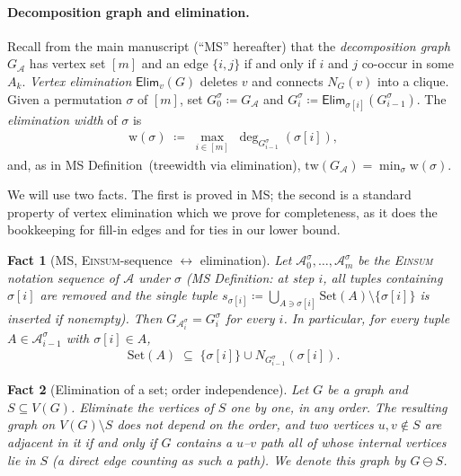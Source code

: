 \documentclass[11pt]{article}
\newcommand{\Einsum}{\textsc{Einsum}}
\newcommand{\calA}{\mathcal{A}}
\newcommand{\tw}{\mathrm{tw}}
\newcommand{\treewidthp}[1]{\tw(#1)}
\newcommand{\takesetp}[1]{\mathrm{Set}(#1)}
\newcommand{\degp}[2]{\deg_{#2}(#1)}
\newcommand{\eliminatevg}[2]{\mathsf{Elim}_{#1}(#2)}
\newcommand{\graphform}[1]{G_{#1}}
\newcommand{\wid}{\mathrm{w}}
\theoremstyle{plain}
\newtheorem{fact}{Fact}
\theoremstyle{definition}
\theoremstyle{remark}
\begin{document}
\paragraph{Decomposition graph and elimination.}
Recall from the main manuscript (``MS'' hereafter) that the
\emph{decomposition graph} $\graphform{\calA}$ has vertex set $[m]$ and an
edge $\{i,j\}$ if and only if $i$ and $j$ co-occur in some $A_k$.
\emph{Vertex elimination} $\eliminatevg{v}{G}$ deletes $v$ and connects
$N_G(v)$ into a clique.  Given a permutation $\sigma$ of $[m]$, set
$G^\sigma_0 \coloneqq \graphform{\calA}$ and
$G^\sigma_i \coloneqq \eliminatevg{\sigma[i]}{G^\sigma_{i-1}}$.  The
\emph{elimination width} of $\sigma$ is
\begin{align*}
   \wid(\sigma) \;\coloneqq\; \max_{i \in [m]}\;
   \degp{\sigma[i]}{G^\sigma_{i-1}},
\end{align*}
and, as in MS Definition~(treewidth via elimination),
$\treewidthp{\graphform{\calA}} = \min_\sigma \wid(\sigma)$.

We will use two facts.  The first is proved in MS; the second is a
standard property of vertex elimination which we prove for completeness,
as it does the bookkeeping for fill-in edges and for ties in our lower
bound.

\begin{fact}[MS, \Einsum{}-sequence $\leftrightarrow$ elimination]
\label{fact:ms}
Let $\calA^\sigma_0,\dots,\calA^\sigma_m$ be the \Einsum{} notation
sequence of $\calA$ under $\sigma$ (MS Definition: at step $i$, all tuples
containing $\sigma[i]$ are removed and the single tuple
$s_{\sigma[i]} \coloneqq \bigcup_{A \ni \sigma[i]} \takesetp{A} \setminus
\{\sigma[i]\}$ is inserted if nonempty).  Then
$\graphform{\calA^\sigma_i} = G^\sigma_i$ for every $i$.  In particular,
for every tuple $A \in \calA^\sigma_{i-1}$ with $\sigma[i] \in A$,
\begin{align*}
   \takesetp{A} \;\subseteq\; \{\sigma[i]\} \cup
   N_{G^\sigma_{i-1}}(\sigma[i]).
\end{align*}
\end{fact}

\begin{fact}[Elimination of a set; order independence]
\label{fact:set-elim}
Let $G$ be a graph and $S \subseteq V(G)$.  Eliminate the vertices of $S$
one by one, in any order.  The resulting graph on $V(G)\setminus S$ does
not depend on the order, and two vertices $u,v \notin S$ are adjacent in
it if and only if $G$ contains a $u$--$v$ path all of whose internal
vertices lie in $S$ (a direct edge counting as such a path).  We denote
this graph by $G \ominus S$.
\end{fact}
\end{document}
